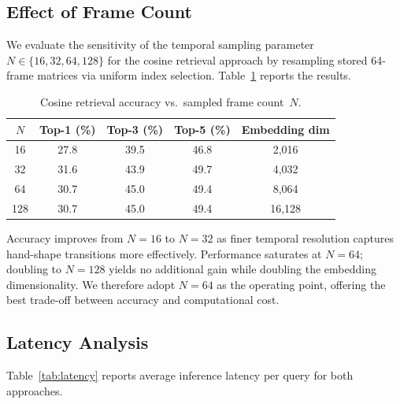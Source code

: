 \documentclass[runningheads]{llncs}
\begin{document}
\subsection{Effect of Frame Count}\label{sec:framecount}

We evaluate the sensitivity of the temporal sampling parameter
$N \in \{16, 32, 64, 128\}$ for the cosine retrieval approach by
resampling stored 64-frame matrices via uniform index selection.
Table~\ref{tab:frames} reports the results.

\begin{table}[t]
\centering
\caption{Cosine retrieval accuracy vs.\ sampled frame count~$N$.}
\label{tab:frames}
\begin{tabular}{@{}ccccc@{}}
\toprule
$N$ & Top-1 (\%) & Top-3 (\%) & Top-5 (\%) & Embedding dim \\
\midrule
16  & 27.8 & 39.5 & 46.8 & 2{,}016 \\
32  & 31.6 & 43.9 & 49.7 & 4{,}032 \\
64  & 30.7 & 45.0 & 49.4 & 8{,}064 \\
128 & 30.7 & 45.0 & 49.4 & 16{,}128 \\
\bottomrule
\end{tabular}
\end{table}

Accuracy improves from $N = 16$ to $N = 32$ as finer temporal
resolution captures hand-shape transitions more effectively.
Performance saturates at $N = 64$; doubling to $N = 128$ yields no
additional gain while doubling the embedding dimensionality.
We therefore adopt $N = 64$ as the operating point, offering the best
trade-off between accuracy and computational cost.

\subsection{Latency Analysis}\label{sec:latency}

Table~\ref{tab:latency} reports average inference latency per query
for both approaches.
\end{document}
